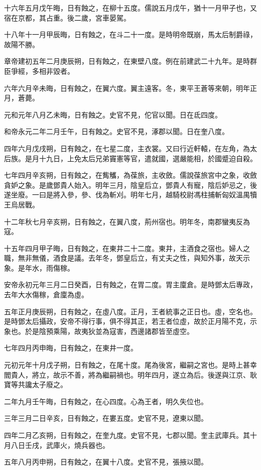 \begin{pinyinscope}
十六年五月戊午晦，日有蝕之，在柳十五度。儒說五月戊午，猶十一月甲子也，又宿在京都，其占重。後二歲，宮車晏駕。

十八年十一月甲辰晦，日有蝕之，在斗二十一度。是時明帝既崩，馬太后制爵祿，故陽不勝。

章帝建初五年二月庚辰朔，日有蝕之，在東壁八度。例在前建武二十九年。是時群臣爭經，多相非毀者。

六年六月辛未晦，日有蝕之，在翼六度。翼主遠客。冬，東平王蒼等來朝，明年正月，蒼薨。

元和元年八月乙未晦，日有蝕之。史官不見，佗官以聞。日在氐四度。

和帝永元二年二月壬午，日有蝕之。史官不見，涿郡以聞。日在奎八度。

四年六月戊戌朔，日有蝕之，在七星二度，主衣裳。又曰行近軒轅，在左角，為太后族。是月十九日，上免太后兄弟竇憲等官，遣就國，選嚴能相，於國蹙迫自殺。

七年四月辛亥朔，日有蝕之，在觜觿，為葆旅，主收斂。儒說葆旅宮中之象，收斂貪妒之象。是歲鄧貴人始入。明年三月，陰皇后立，鄧貴人有寵，陰后妒忌之，後遂坐廢。一曰是將入參，參、伐為斬刈。明年七月，越騎校尉馮柱捕斬匈奴溫禺犢王烏居戰。

十二年秋七月辛亥朔，日有蝕之，在翼八度，荊州宿也。明年冬，南郡蠻夷反為寇。

十五年四月甲子晦，日有蝕之，在東井二十二度。東井，主酒食之宿也。婦人之職，無非無儀，酒食是議。去年冬，鄧皇后立，有丈夫之性，與知外事，故天示象。是年水，雨傷稼。

安帝永初元年三月二日癸酉，日有蝕之，在胃二度。胃主廩倉。是時鄧太后專政，去年大水傷稼，倉廩為虛。

五年正月庚辰朔，日有蝕之，在虛八度。正月，王者統事之正日也。虛，空名也。是時鄧太后攝政，安帝不得行事，俱不得其正，若王者位虛，故於正月陽不克，示象也。於是陰預乘陽，故夷狄並為寇害，西邊諸郡皆至虛空。

七年四月丙申晦，日有蝕之，在東井一度。

元初元年十月戊子朔，日有蝕之，在尾十度。尾為後宮，繼嗣之宮也。是時上甚幸閻貴人，將立，故示不善，將為繼嗣禍也。明年四月，遂立為后。後遂與江京、耿寶等共讒太子廢之。

二年九月壬午晦，日有蝕之，在心四度。心為王者，明久失位也。

三年三月二日辛亥，日有蝕之，在婁五度。史官不見，遼東以聞。

四年二月乙亥朔，日有蝕之，在奎九度。史官不見，七郡以聞。奎主武庫兵。其十月八日壬戌，武庫火，燒兵器也。

五年八月丙申朔，日有蝕之，在翼十八度。史官不見，張掖以聞。


\end{pinyinscope}
